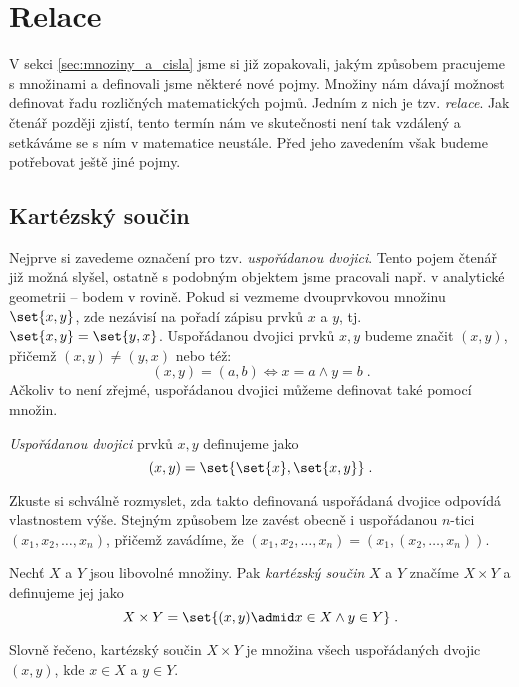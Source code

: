 \section{Relace}\label{sec:relace}
V sekci \ref{sec:mnoziny_a_cisla} jsme si již zopakovali, jakým způsobem pracujeme s množinami a definovali jsme některé nové pojmy. Množiny nám dávají možnost definovat řadu rozličných matematických pojmů. Jedním z nich je tzv. \emph{relace}. Jak čtenář později zjistí, tento termín nám ve skutečnosti není tak vzdálený a setkáváme se s ním v matematice neustále. Před jeho zavedením však budeme potřebovat ještě jiné pojmy.

\subsection{Kartézský součin}
Nejprve si zavedeme označení pro tzv. \emph{uspořádanou dvojici}. Tento pojem čtenář již možná slyšel, ostatně s podobným objektem jsme pracovali např. v analytické geometrii -- bodem v rovině. Pokud si vezmeme dvouprvkovou množinu $\set{x,y}$, zde nezávisí na pořadí zápisu prvků $x$ a $y$, tj. $\set{x,y}=\set{y,x}$. Uspořádanou dvojici prvků $x,y$ budeme značit $(x,y)$, přičemž $(x,y)\neq (y,x)$ nebo též:
\begin{equation*}
    (x,y)=(a,b) \iff x=a \land y=b\; .
\end{equation*}
Ačkoliv to není zřejmé, uspořádanou dvojici můžeme definovat také pomocí množin.
\begin{definition}
    \emph{Uspořádanou dvojici} prvků $x,y$ definujeme jako
    \begin{equation*}
        (x,y)=\set{\set{x},\set{x,y}}\; .
    \end{equation*}
\end{definition}
Zkuste si schválně rozmyslet, zda takto definovaná uspořádaná dvojice odpovídá vlastnostem výše. Stejným způsobem lze zavést obecně i uspořádanou $n$-tici $(x_1, x_2, \ldots, x_n)$, přičemž zavádíme, že $(x_1, x_2, \ldots, x_n)=(x_1, (x_2, \ldots, x_n))$.
\begin{definition}
    Nechť $X$ a $Y$ jsou libovolné množiny. Pak \emph{kartézský součin} $X$ a $Y$ značíme $X\times Y$ a definujeme jej jako
    \begin{equation*}
        X\times Y=\set{(x,y) \admid x\in X \land y\in Y}\; .
    \end{equation*}
\end{definition}
Slovně řečeno, kartézský součin $X\times Y$ je množina všech uspořádaných dvojic $(x,y)$, kde $x\in X$ a $y\in Y$.
